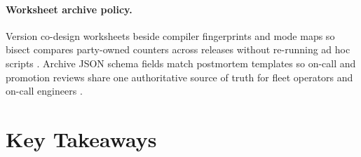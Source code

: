 \paragraph{Worksheet archive policy.} Version co-design worksheets beside compiler fingerprints and mode maps so bisect compares party-owned counters across releases without re-running ad hoc scripts \citep{yirage2026,chen2020compilerbasedhardw,patel2025llminference,kwon2023vllm,taxbreak2026,memoryfloor2026,liu2024deepseekv3,nvidia2024cudagraphs,dao2022flashattention,amd2024aie,amd2024xdna,dlbook,dao2023flashdecoding,nvidia2022hopper,semianalysis2024tma}. Archive JSON schema fields match postmortem templates so on-call and promotion reviews share one authoritative source of truth for fleet operators and on-call engineers \citep{patel2025llminference,yirage2026,chen2020compilerbasedhardw,kwon2023vllm,dlbook}.

\section{Key Takeaways}
\label{sec:ch30_key_takeaways}

